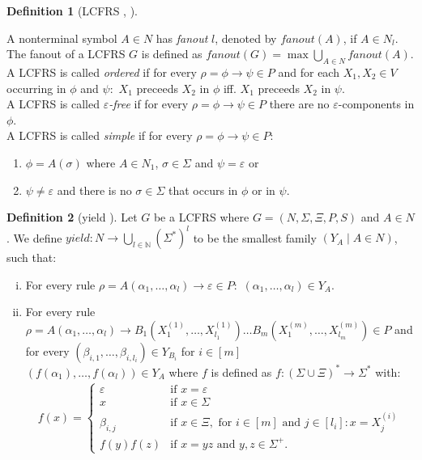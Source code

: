 \documentclass{tudscrartcl}
\theoremstyle{definition}
\newtheorem{definition}{Definition}[section]
\begin{document}
\begin{definition}[LCFRS \cite{vshanker87}, \cite{kallmeyer12}]
\begin{itemize}
	\end{itemize}
	A nonterminal symbol $A \in N$ has \emph{fanout} $l$, denoted by $fanout(A)$, if
	$A \in N_l$. The fanout of a LCFRS $G$ is defined as
	$fanout(G) = \max \bigcup_{A \in N}fanout(A)$.\\
	A LCFRS is called \emph{ordered} if for every
	$\rho = \phi \to \psi \in P$ and for each
	$X_1, X_2 \in V$ occurring in $\phi$ and $\psi:$
	$X_1$ preceeds $X_2$ in $\phi$ iff. $X_1$ preceeds $X_2$ in $\psi$.\\
	A LCFRS is called \emph{$\varepsilon$-free} if for every
	$\rho = \phi \to \psi \in P$ there are no $\varepsilon$-components in $\phi$.\\
	A LCFRS is called \emph{simple} if for every $\rho = \phi \to \psi \in P:$
	\begin{enumerate}
		\item $\phi = A(\sigma)$ where $A \in N_1$, $\sigma \in \Sigma$
			and $\psi = \varepsilon$ or
		\item $\psi \neq \varepsilon$ and
			there is no $\sigma \in \Sigma$ that occurs in $\phi$ or in $\psi$.
	\end{enumerate}
\end{definition}

\begin{definition}[yield \cite{kallmeyer10}]
	Let $G$ be a LCFRS where $G = (N, \Sigma, \Xi, P, S)$ and $A \in N$.
	We define $yield: N \to \bigcup_{l \in \mathbb{N}}(\Sigma^*)^l$ to be the
	smallest family $(Y_A \mid A \in N)$, such that:
	\begin{enumerate}[(i)]
		\item For every rule
			$\rho = A(\alpha_1, \ldots, \alpha_l) \to \varepsilon \in P:$
			$(\alpha_1, \ldots, \alpha_l) \in Y_A$.
		\item For every rule $\rho = A(\alpha_1, \ldots, \alpha_l) \to
			B_1(X^{(1)}_1, \ldots, X^{(1)}_{l_1}) \ldots
			B_m(X^{(m)}_1, \ldots, X^{(m)}_{l_m}) \in P$ and for every
			$(\beta_{i, 1}, \ldots, \beta_{i, l_i}) \in Y_{B_i}$
			for $i \in [m]$\\
			$(f(\alpha_1), \ldots, f(\alpha_l)) \in Y_A$ where $f$ is defined as
			$f: (\Sigma \cup \Xi)^* \to \Sigma^*$ with:
			\begin{align*}
				f(x) =
				\begin{cases}
					\varepsilon & \text{if } x = \varepsilon\\
					x & \text{if } x \in \Sigma \\
					\beta_{i, j} & \text{if } x \in \Xi,
					\text{ for } i \in [m] \text{ and } j \in [l_i]: x = X^{(i)}_j \\
					f(y)f(z) & \text{if } x = yz
					\text{ and } y, z \in \Sigma^+.
				\end{cases}
			\end{align*}
	\end{enumerate}
\end{definition}
\end{document}
